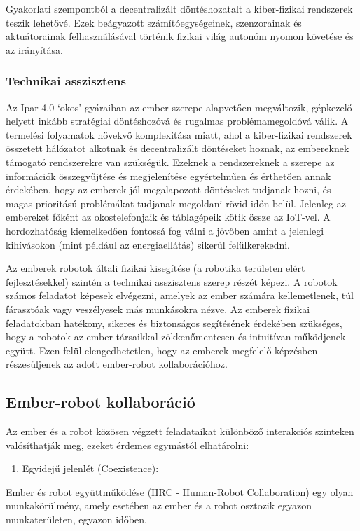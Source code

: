 \documentclass[../documentation.tex]{subfiles}
\begin{document}
Gyakorlati szempontból a decentralizált döntéshozatalt a kiber-fizikai rendszerek teszik lehetővé. Ezek beágyazott számítóegységeinek, szenzorainak és aktuátorainak felhasználásával történik fizikai világ autonóm nyomon követése és az irányítása.  

\subsubsection{Technikai asszisztens}
Az Ipar 4.0 `okos' gyáraiban az ember szerepe alapvetően megváltozik, gépkezelő helyett inkább stratégiai döntéshozóvá és rugalmas problémamegoldóvá válik. A termelési folyamatok növekvő komplexitása miatt, ahol a kiber-fizikai rendszerek összetett hálózatot alkotnak és decentralizált döntéseket hoznak, az embereknek támogató rendszerekre van szükségük. Ezeknek a rendszereknek a szerepe az információk összegyűjtése és megjelenítése egyértelműen és érthetően annak érdekében, hogy az emberek jól megalapozott döntéseket tudjanak hozni, és magas prioritású problémákat tudjanak megoldani rövid időn belül. Jelenleg az embereket főként az okostelefonjaik és táblagépeik kötik össze az IoT-vel\cite{fromiot2ioe}. A hordozhatóság kiemelkedően fontossá fog válni a jövőben amint a jelenlegi kihívásokon (mint például az energiaellátás) sikerül felülkerekedni.

Az emberek robotok általi fizikai kisegítése (a robotika területen elért fejlesztésekkel) szintén a technikai asszisztens szerep részét képezi. A robotok számos feladatot képesek elvégezni, amelyek az ember számára kellemetlenek, túl fárasztóak vagy veszélyesek más munkásokra nézve\cite{hri}. Az emberek fizikai feladatokban hatékony, sikeres és biztonságos segítésének érdekében szükséges, hogy a robotok az ember társaikkal zökkenőmentesen és intuitívan működjenek együtt\cite{hri}. Ezen felül elengedhetetlen, hogy az emberek megfelelő képzésben részesüljenek az adott ember-robot kollaborációhoz\cite{m-learning}.

\subsection{Ember-robot kollaboráció}
Az ember és a robot közösen végzett feladataikat különböző interakciós szinteken valósíthatják meg, ezeket érdemes egymástól elhatárolni:

\begin{enumerate}
	\item Egyidejű jelenlét (Coexistence): 
\end{enumerate}
Ember és robot együttműködése (HRC - \foreignlanguage{british}{Human-Robot Collaboration}) egy olyan munkakörülmény, amely esetében az ember és a robot osztozik egyazon munkaterületen, egyazon időben. 
\end{document}

